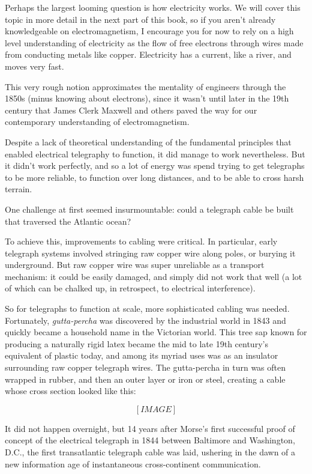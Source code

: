 \documentclass{book}
\begin{document}
Perhaps the largest looming question is how electricity works. We will cover this topic in more detail in the next part of this book, so if you aren't already knowledgeable on electromagnetism, I encourage you for now to rely on a high level understanding of electricity as the flow of free electrons through wires made from conducting metals like copper. Electricity has a current, like a river, and moves very fast.

This very rough notion approximates the mentality of engineers through the 1850s (minus knowing about electrons), since it wasn't until later in the 19th century that James Clerk Maxwell and others paved the way for our contemporary understanding of electromagnetism.

Despite a lack of theoretical understanding of the fundamental principles that enabled electrical telegraphy to function, it did manage to work nevertheless. But it didn't work perfectly, and so a lot of energy was spend trying to get telegraphs to be more reliable, to function over long distances, and to be able to cross harsh terrain.

One challenge at first seemed insurmountable: could a telegraph cable be built that traversed the Atlantic ocean?

To achieve this, improvements to cabling were critical. In particular, early telegraph systems involved stringing raw copper wire along poles, or burying it underground. But raw copper wire was super unreliable as a transport mechanism: it could be easily damaged, and simply did not work that well (a lot of which can be chalked up, in retrospect, to electrical interference).

So for telegraphs to function at scale, more sophisticated cabling was needed. Fortunately, \emph{gutta-percha} was discovered by the industrial world in 1843 and quickly became a household name in the Victorian world. This tree sap known for producing a naturally rigid latex became the mid to late 19th century's equivalent of plastic today, and among its myriad uses was as an insulator surrounding raw copper telegraph wires. The gutta-percha in turn was often wrapped in rubber, and then an outer layer or iron or steel, creating a cable whose cross section looked like this:

\[ [IMAGE] \]

It did not happen overnight, but 14 years after Morse's first successful proof of concept of the electrical telegraph in 1844 between Baltimore and Washington, D.C., the first transatlantic telegraph cable was laid, ushering in the dawn of a new information age of instantaneous cross-continent communication.
\end{document}
